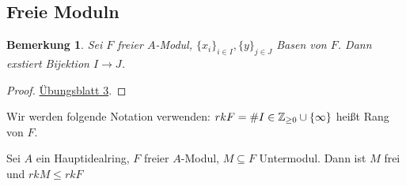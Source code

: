 \documentclass[12pt,a4paper]{scrartcl}
\theoremstyle{cplain}
\theoremstyle{cdef}
\newtheorem{beme}[thmcounter]{Bemerkung}
\begin{document}
\subsection{Freie Moduln}
\begin{beme}
	Sei $F$ freier $A$-Modul, $\{x_i\}_{i\in I}, \{y\}_{j\in J}$ Basen von $F$. Dann exstiert Bijektion $I\to J$.
\end{beme}
\begin{proof}
	\href{http://www.math.uni-bonn.de/ag/stroppel/Franzen_Algebra_1_Uebung/Blatt3.pdf}{Übungsblatt 3}.
\end{proof}

Wir werden folgende Notation verwenden: $rk F=\# I \in\mathbb Z_{\geq 0}\cup \{\infty\}$ heißt Rang von $F$. %

\begin{satz}
	Sei $A$ ein Hauptidealring, $F$ freier $A$-Modul, $M\subseteq F$ Untermodul. Dann ist $M$ frei und $rk M\leq rk F$
\end{satz}
\end{document}
